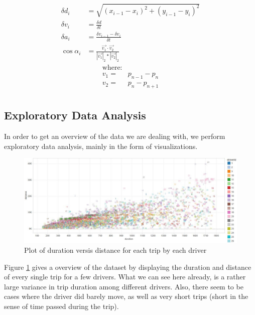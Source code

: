 \documentclass{vldb}
\begin{document}
\begin{align}
\delta d_i &= \sqrt{(x_{i-1} - x_{i})^2 + (y_{i-1} - y_{i})^2} \\
\delta v_i &= \frac{\delta d}{\delta t} \\
\delta a_i &= \frac{\delta v_{i-1} - \delta v_{i}}{\delta t} \\
\cos \alpha_i &= \frac{\vec{v_1} \cdot \vec{v_2}}{|\vec{v_1}|_2 * |\vec{v_2}|_2}
\end{align}
\begin{align*}
\text{where:}\\
v_1 =& p_{n-1} - p_{n} \\
v_2 =& p_{n} - p_{n+1}\\
\end{align*}


\subsection{Exploratory Data Analysis}
In order to get an overview of the data we are dealing with, we perform exploratory data analysis, mainly in the form of visualizations.

\begin{figure}
\centering
\includegraphics[width=\linewidth]{"pics/duration-vs-distance-driver"}
\caption{Plot of duration versis distance for each trip by each driver}
\label{fig:duration-vs-distance}
\end{figure}
Figure \ref{fig:duration-vs-distance} gives a overview of the dataset by displaying the duration and distance of every single trip for a few drivers. What we can see here already, is a rather large variance in trip duration among different drivers. Also, there seem to be cases where the driver did barely move, as well as very short trips (short in the sense of time passed during the trip).
\end{document}
